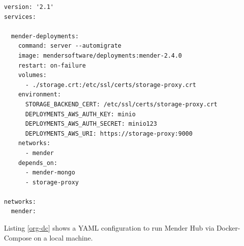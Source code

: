 \begin{code}
  \label{org-dc}
  \begin{verbatim}
version: '2.1'
services:

  mender-deployments:
    command: server --automigrate
    image: mendersoftware/deployments:mender-2.4.0
    restart: on-failure
    volumes:
      - ./storage.crt:/etc/ssl/certs/storage-proxy.crt
    environment:
      STORAGE_BACKEND_CERT: /etc/ssl/certs/storage-proxy.crt
      DEPLOYMENTS_AWS_AUTH_KEY: minio
      DEPLOYMENTS_AWS_AUTH_SECRET: minio123
      DEPLOYMENTS_AWS_URI: https://storage-proxy:9000
    networks:
      - mender
    depends_on:
      - mender-mongo
      - storage-proxy

networks:
  mender:
  \end{verbatim}
\end{code}
Listing \ref{org-dc} shows a YAML configuration to run Mender Hub via Docker-Compose on a local machine.
